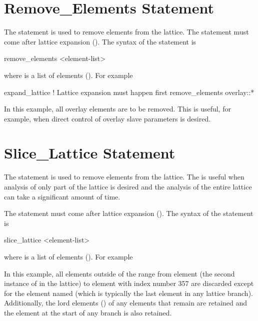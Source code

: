 {{{{{%
\section{Remove_Elements Statement}
\label{s:remove.ele}

The  statement is used to remove elements from the lattice. The
 statement must come after lattice expansion (). The syntax of
the  statement is
\begin{example}
  remove_elements <element-list>
\end{example}
where  is a list of elements (). For example
\begin{example}
  expand_lattice              ! Lattice expansion must happen first
  remove_elements overlay::*
\end{example}
In this example, all overlay elements are to be removed. This is useful, for example, when direct control
of overlay slave parameters is desired.

\section{Slice_Lattice Statement}
\label{s:slice}

The  statement is used to remove elements from the lattice. The 
is useful when analysis of only part of the lattice is desired and the analysis of the entire
lattice can take a significant amount of time.

The  statement must come after lattice expansion (). The syntax of
the  statement is
\begin{example}
  slice_lattice <element-list>
\end{example}
where  is a list of elements (). For example
In this example, all elements outside of the range from element  (the second instance of
 in the lattice) to element with index number 357 are discarded except for the element named
 (which is typically the last element in any lattice branch). Additionally, the lord
elements () of any elements that remain are retained and the 
element at the start of any branch is also retained.

}}}}}
